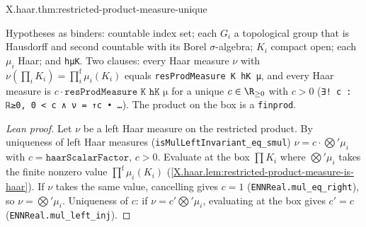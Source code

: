 \begin{tfformal}{X.haar.thm:restricted-product-measure-unique}
\begin{tffidelity}
Hypotheses as binders: countable index set; each $G_i$ a topological group that is Hausdorff and second countable with its Borel $\sigma$-algebra; $K_i$ compact open; each $\mu_i$ Haar; and \texttt{hμK}. Two clauses: every Haar measure $\nu$ with $\nu(\prod_iK_i)=\prod^{\mathrm f}_i\mu_i(K_i)$ equals \texttt{resProdMeasure K hK μ}, and every Haar measure is $c\cdot\texttt{resProdMeasure K hK μ}$ for a unique $c\in\R_{\ge0}$ with $c>0$ (\texttt{∃! c : ℝ≥0, 0 < c ∧ ν = ↑c • …}). The product on the box is a \texttt{finprod}.
\end{tffidelity}
\end{tfformal}
\begin{proof}[Lean proof]
Let $\nu$ be a left Haar measure on the restricted product. By uniqueness of left Haar measures (\texttt{isMulLeftInvariant\_eq\_smul}) $\nu=c\cdot\bigotimes'\mu_i$ with $c=\texttt{haarScalarFactor}$, $c>0$. Evaluate at the box $\prod K_i$ where $\bigotimes'\mu_i$ takes the finite nonzero value $\prod^{\mathrm f}\mu_i(K_i)$ (\cref{X.haar.lem:restricted-product-measure-is-haar}). If $\nu$ takes the same value, cancelling gives $c=1$ (\texttt{ENNReal.mul\_eq\_right}), so $\nu=\bigotimes'\mu_i$. Uniqueness of $c$: if $\nu=c'\bigotimes'\mu_i$, evaluating at the box gives $c'=c$ (\texttt{ENNReal.mul\_left\_inj}).
\end{proof}

